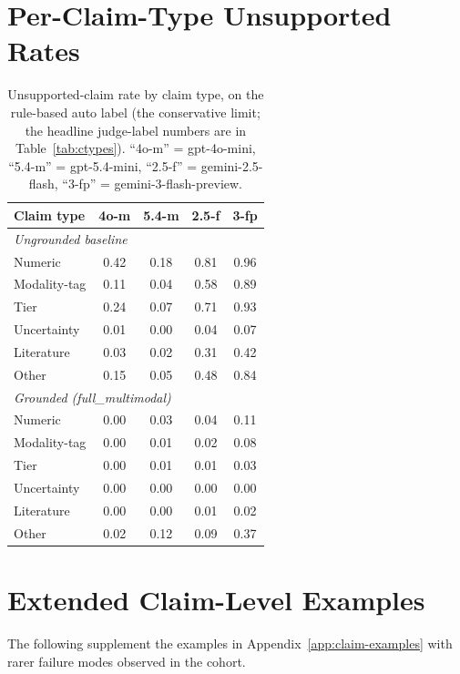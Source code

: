 \documentclass{article}
\theoremstyle{plain}
\begin{document}
\section{Per-Claim-Type Unsupported Rates}
\label{app:claim-types}

\begin{table}[h]
\centering
\small
\begin{tabular}{lcccc}
\toprule
\textbf{Claim type} & \textbf{4o-m} & \textbf{5.4-m} & \textbf{2.5-f} & \textbf{3-fp} \\
\midrule
\multicolumn{5}{l}{\emph{Ungrounded baseline}} \\
Numeric        & 0.42 & 0.18 & 0.81 & 0.96 \\
Modality-tag   & 0.11 & 0.04 & 0.58 & 0.89 \\
Tier           & 0.24 & 0.07 & 0.71 & 0.93 \\
Uncertainty    & 0.01 & 0.00 & 0.04 & 0.07 \\
Literature     & 0.03 & 0.02 & 0.31 & 0.42 \\
Other          & 0.15 & 0.05 & 0.48 & 0.84 \\
\midrule
\multicolumn{5}{l}{\emph{Grounded (full\_multimodal)}} \\
Numeric        & 0.00 & 0.03 & 0.04 & 0.11 \\
Modality-tag   & 0.00 & 0.01 & 0.02 & 0.08 \\
Tier           & 0.00 & 0.01 & 0.01 & 0.03 \\
Uncertainty    & 0.00 & 0.00 & 0.00 & 0.00 \\
Literature     & 0.00 & 0.00 & 0.01 & 0.02 \\
Other          & 0.02 & 0.12 & 0.09 & 0.37 \\
\bottomrule
\end{tabular}
\caption{Unsupported-claim rate by claim type, on the rule-based auto label (the conservative limit; the headline judge-label numbers are in Table~\ref{tab:ctypes}). ``4o-m'' = gpt-4o-mini, ``5.4-m'' = gpt-5.4-mini, ``2.5-f'' = gemini-2.5-flash, ``3-fp'' = gemini-3-flash-preview.}
\label{tab:ctypes-rule}
\end{table}

\section{Extended Claim-Level Examples}
\label{app:extended-examples}

The following supplement the examples in Appendix~\ref{app:claim-examples} with rarer failure modes observed in the cohort.
\end{document}
